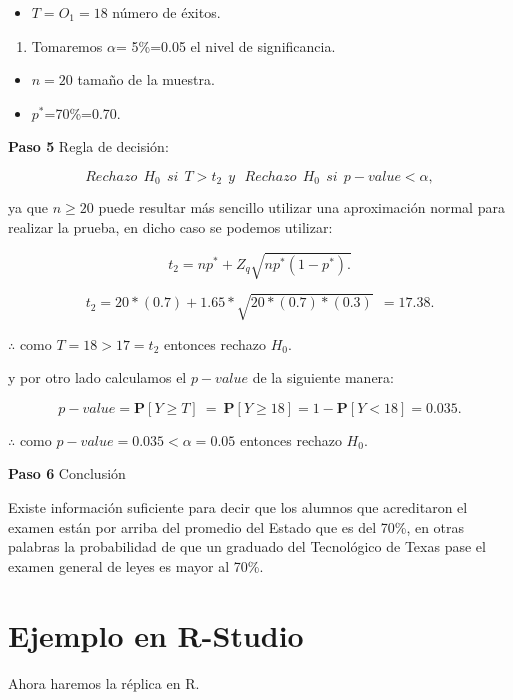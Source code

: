 \documentclass[
  a4paper,
  oneside,
  openany]{book}
\providecommand{\tightlist}{%
  \setlength{\itemsep}{0pt}\setlength{\parskip}{0pt}}
\begin{document}
\begin{itemize}
\tightlist
\item
  \(T=O_{1}=18\) número de éxitos.
\end{itemize}

\begin{enumerate}
\def\labelenumi{\arabic{enumi}.}
\setcounter{enumi}{2}
\tightlist
\item
  Tomaremos \(\alpha\)= 5\%=0.05 el nivel de significancia.
\end{enumerate}

\begin{itemize}
\item
  \(n=20\) tamaño de la muestra.
\item
  \(p^*\)=70\%=0.70.
\end{itemize}

\textbf{Paso 5} Regla de decisión:

\[Rechazo \ \  H_0 \ \  si \ \ T>t_{2} \ \  y \ \ \  Rechazo \ \  H_0 \ \ si \ \  p-value<\alpha,\]

ya que \(n \geq 20\) puede resultar más sencillo utilizar una aproximación normal para realizar la prueba, en dicho caso se podemos utilizar:

\[t_{2}=np^*+Z_{q}\sqrt{np^*(1-p^*).}\]

\[t_{2}=20*(0.7)+1.65*\sqrt{20*(0.7)*(0.3)} \ \ = 17.38.\]

\(\therefore\) como \(T=18>17=t_{2}\) entonces rechazo \(H_0\).

y por otro lado calculamos el \(p-value\) de la siguiente manera:

\[p-value= \mathbf{P}[Y \geq T] \  = \ \mathbf{P}[Y \geq 18]=1-\mathbf{P}[Y < 18]= 0.035.\]

\(\therefore\) como \(p-value=0.035<\alpha=0.05\) entonces rechazo \(H_0\).

\textbf{Paso 6} Conclusión

Existe información suficiente para decir que los alumnos que acreditaron el examen están por arriba del promedio del Estado que es del 70\%, en otras palabras la probabilidad de que un graduado del Tecnológico de Texas pase el examen general de leyes es mayor al 70\%.

\hypertarget{ejemplo-en-r-studio}{%
\section{Ejemplo en R-Studio}\label{ejemplo-en-r-studio}}

Ahora haremos la réplica en R.
\end{document}
